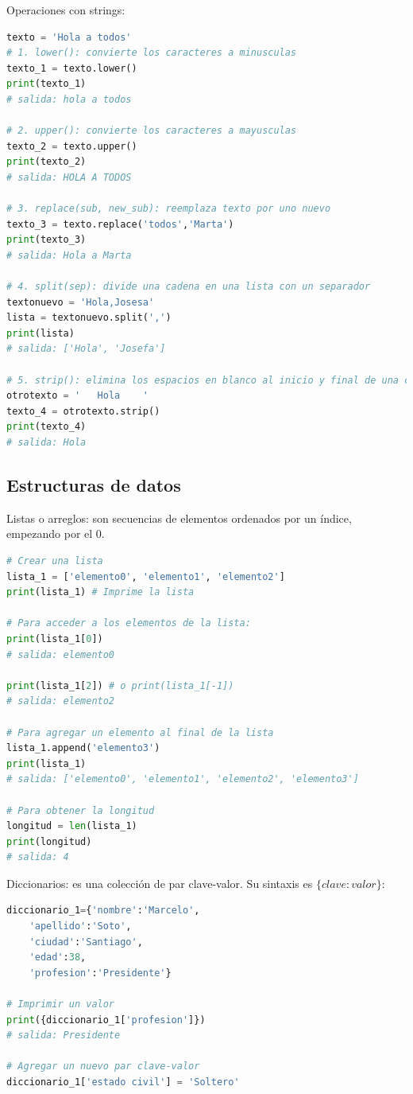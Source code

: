 \documentclass[a4paper, 12pt]{book}
\begin{document}
Operaciones con strings:
\begin{lstlisting}[language=Python]
texto = 'Hola a todos'
# 1. lower(): convierte los caracteres a minusculas
texto_1 = texto.lower()
print(texto_1)
# salida: hola a todos
	
# 2. upper(): convierte los caracteres a mayusculas
texto_2 = texto.upper()
print(texto_2)
# salida: HOLA A TODOS
	
# 3. replace(sub, new_sub): reemplaza texto por uno nuevo
texto_3 = texto.replace('todos','Marta')
print(texto_3)
# salida: Hola a Marta
	
# 4. split(sep): divide una cadena en una lista con un separador
textonuevo = 'Hola,Josesa'
lista = textonuevo.split(',')
print(lista)
# salida: ['Hola', 'Josefa']
	
# 5. strip(): elimina los espacios en blanco al inicio y final de una cadena
otrotexto = '	Hola	'
texto_4 = otrotexto.strip()
print(texto_4)
# salida: Hola
\end{lstlisting}

\subsection{Estructuras de datos}
Listas o arreglos: son secuencias de elementos ordenados por un índice, empezando por el 0.
\begin{lstlisting}[language=Python]
# Crear una lista
lista_1 = ['elemento0', 'elemento1', 'elemento2']
print(lista_1) # Imprime la lista
	
# Para acceder a los elementos de la lista:
print(lista_1[0])
# salida: elemento0
	
print(lista_1[2]) # o print(lista_1[-1])
# salida: elemento2
	
# Para agregar un elemento al final de la lista
lista_1.append('elemento3')
print(lista_1)
# salida: ['elemento0', 'elemento1', 'elemento2', 'elemento3']
	
# Para obtener la longitud
longitud = len(lista_1)
print(longitud)
# salida: 4
\end{lstlisting}

Diccionarios: es una colección de par clave-valor. Su sintaxis es $\{clave: valor\}$:
\begin{lstlisting}[language=Python]
diccionario_1={'nombre':'Marcelo',
	'apellido':'Soto',
	'ciudad':'Santiago',
	'edad':38,
	'profesion':'Presidente'}
	
# Imprimir un valor
print({diccionario_1['profesion']})
# salida: Presidente
	
# Agregar un nuevo par clave-valor
diccionario_1['estado civil'] = 'Soltero'
\end{lstlisting}
\end{document}
